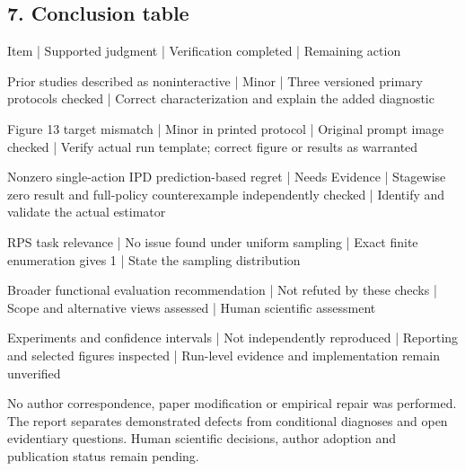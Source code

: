 \documentclass[10pt]{article}
\begin{document}
\subsection*{7. Conclusion table}
Item | Supported judgment | Verification completed | Remaining action\par
Prior studies described as noninteractive | Minor | Three versioned primary protocols checked | Correct characterization and explain the added diagnostic\par
Figure 13 target mismatch | Minor in printed protocol | Original prompt image checked | Verify actual run template; correct figure or results as warranted\par
Nonzero single-action IPD prediction-based regret | Needs Evidence | Stagewise zero result and full-policy counterexample independently checked | Identify and validate the actual estimator\par
RPS task relevance | No issue found under uniform sampling | Exact finite enumeration gives 1 | State the sampling distribution\par
Broader functional evaluation recommendation | Not refuted by these checks | Scope and alternative views assessed | Human scientific assessment\par
Experiments and confidence intervals | Not independently reproduced | Reporting and selected figures inspected | Run-level evidence and implementation remain unverified\par
No author correspondence, paper modification or empirical repair was performed. The report separates demonstrated defects from conditional diagnoses and open evidentiary questions. Human scientific decisions, author adoption and publication status remain pending.\par
\end{document}
